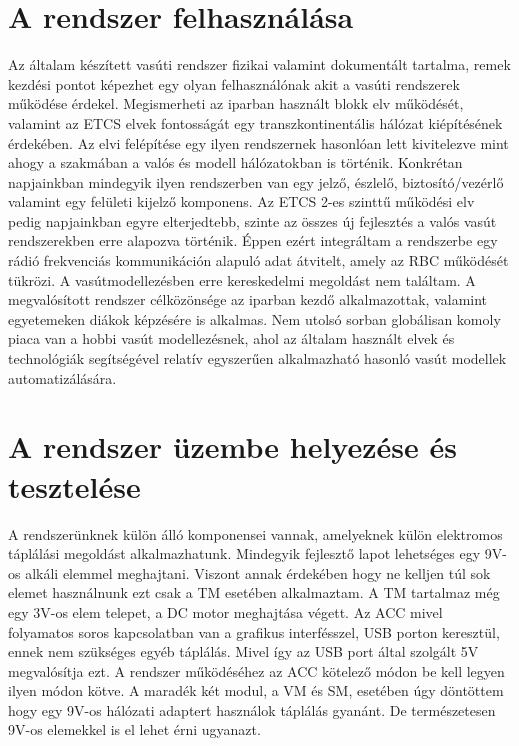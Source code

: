\documentclass[a4paper,12pt]{article}
\begin{document}
\section{A rendszer felhasználása}
Az általam készített vasúti rendszer fizikai valamint dokumentált tartalma, remek kezdési pontot képezhet egy olyan felhasználónak akit a vasúti rendszerek működése érdekel.
Megismerheti az iparban használt blokk elv működését, valamint az ETCS elvek fontosságát egy transzkontinentális hálózat kiépítésének érdekében.
Az elvi felépítése egy ilyen rendszernek hasonlóan lett kivitelezve mint ahogy a szakmában a valós és modell hálózatokban is történik.
Konkrétan napjainkban mindegyik ilyen rendszerben van egy jelző, észlelő, biztosító/vezérlő valamint egy felületi kijelző komponens.
Az ETCS 2-es szinttű működési elv pedig napjainkban egyre elterjedtebb, szinte az összes új fejlesztés a valós vasút rendszerekben erre alapozva történik.
Éppen ezért integráltam a rendszerbe egy rádió frekvenciás kommunikáción alapuló adat átvitelt, amely az RBC működését tükrözi.
A vasútmodellezésben erre kereskedelmi megoldást nem találtam.
A megvalósított rendszer célközönsége az iparban kezdő alkalmazottak, valamint egyetemeken diákok képzésére is alkalmas.
Nem utolsó sorban globálisan komoly piaca van a hobbi vasút modellezésnek, ahol az általam használt elvek és technológiák segítségével relatív egyszerűen alkalmazható hasonló vasút modellek automatizálására. 
\newpage
\section{A rendszer üzembe helyezése és tesztelése}

A rendszerünknek külön álló komponensei vannak, amelyeknek külön elektromos táplálási megoldást alkalmazhatunk.
Mindegyik fejlesztő lapot lehetséges egy 9V-os alkáli elemmel meghajtani.
Viszont annak érdekében hogy ne kelljen túl sok elemet használnunk ezt csak a TM esetében alkalmaztam.
A TM tartalmaz még egy 3V-os elem telepet, a DC motor meghajtása végett.
Az ACC mivel folyamatos soros kapcsolatban van a grafikus interfésszel, USB porton keresztül, ennek nem szükséges egyéb táplálás.
Mivel így az USB port által szolgált 5V megvalósítja ezt. A rendszer működéséhez az ACC kötelező módon be kell legyen ilyen módon kötve.
A maradék két modul, a VM és SM, esetében úgy döntöttem hogy egy 9V-os hálózati adaptert használok táplálás gyanánt.
De természetesen 9V-os elemekkel is el lehet érni ugyanazt.
\end{document}
